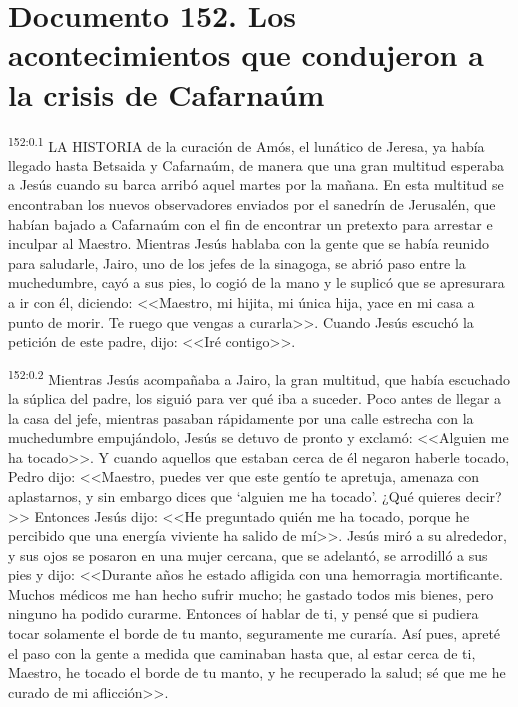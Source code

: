 \chapter{Documento 152. Los acontecimientos que condujeron a la crisis de Cafarnaúm}
\par 
\textsuperscript{152:0.1} LA HISTORIA de la curación de Amós, el lunático de Jeresa, ya había llegado hasta Betsaida y Cafarnaúm, de manera que una gran multitud esperaba a Jesús cuando su barca arribó aquel martes por la mañana. En esta multitud se encontraban los nuevos observadores enviados por el sanedrín de Jerusalén, que habían bajado a Cafarnaúm con el fin de encontrar un pretexto para arrestar e inculpar al Maestro. Mientras Jesús hablaba con la gente que se había reunido para saludarle, Jairo, uno de los jefes de la sinagoga, se abrió paso entre la muchedumbre, cayó a sus pies, lo cogió de la mano y le suplicó que se apresurara a ir con él, diciendo: <<Maestro, mi hijita, mi única hija, yace en mi casa a punto de morir. Te ruego que vengas a curarla>>. Cuando Jesús escuchó la petición de este padre, dijo: <<Iré contigo>>.

\par 
\textsuperscript{152:0.2} Mientras Jesús acompañaba a Jairo, la gran multitud, que había escuchado la súplica del padre, los siguió para ver qué iba a suceder. Poco antes de llegar a la casa del jefe, mientras pasaban rápidamente por una calle estrecha con la muchedumbre empujándolo, Jesús se detuvo de pronto y exclamó: <<Alguien me ha tocado>>. Y cuando aquellos que estaban cerca de él negaron haberle tocado, Pedro dijo: <<Maestro, puedes ver que este gentío te apretuja, amenaza con aplastarnos, y sin embargo dices que `alguien me ha tocado'. ¿Qué quieres decir?>> Entonces Jesús dijo: <<He preguntado quién me ha tocado, porque he percibido que una energía viviente ha salido de mí>>. Jesús miró a su alrededor, y sus ojos se posaron en una mujer cercana, que se adelantó, se arrodilló a sus pies y dijo: <<Durante años he estado afligida con una hemorragia mortificante. Muchos médicos me han hecho sufrir mucho; he gastado todos mis bienes, pero ninguno ha podido curarme. Entonces oí hablar de ti, y pensé que si pudiera tocar solamente el borde de tu manto, seguramente me curaría. Así pues, apreté el paso con la gente a medida que caminaban hasta que, al estar cerca de ti, Maestro, he tocado el borde de tu manto, y he recuperado la salud; sé que me he curado de mi aflicción>>.

